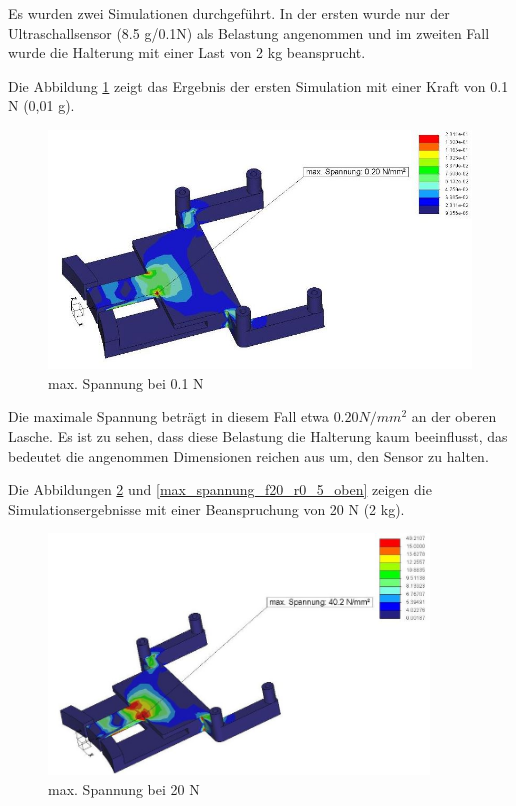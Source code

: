 	Es wurden zwei Simulationen durchgeführt. In der ersten wurde nur der Ultraschallsensor (8.5 g/\ca 0.1N) als Belastung angenommen und im zweiten Fall  wurde die Halterung mit einer Last von 2 kg beansprucht.

	Die Abbildung \ref{max_spannung_f0_1_r0_5} zeigt das Ergebnis der ersten Simulation mit einer Kraft von 0.1 N (0,01 g).

			\begin{figure}[H]
			\begin{centering}
			\includegraphics[width = 1.1\textwidth]{Bilder/max_spannung_f0_1_r0_5}
			\par\end{centering}
			\caption{max. Spannung bei 0.1 N}
			\label{max_spannung_f0_1_r0_5}
			\end{figure}

	Die maximale Spannung beträgt in diesem Fall etwa $0.20 N/mm^{2}$ an der oberen Lasche.
	Es ist zu sehen, dass diese Belastung die Halterung kaum beeinflusst, das bedeutet die angenommen Dimensionen reichen aus um, den Sensor zu halten.

			\newpage

	Die Abbildungen \ref{max_spannung_f20_r0_5} und \ref{max_spannung_f20_r0_5_oben}  zeigen die Simulationsergebnisse mit einer Beanspruchung von 20 N (2 kg).

			\begin{figure}[H]
			\begin{centering}
			\includegraphics[width = 0.9\textwidth]{Bilder/max_spannung_f20_r0_5}
			\par\end{centering}
			\caption{max. Spannung bei 20 N}
			\label{max_spannung_f20_r0_5}
			\end{figure}

